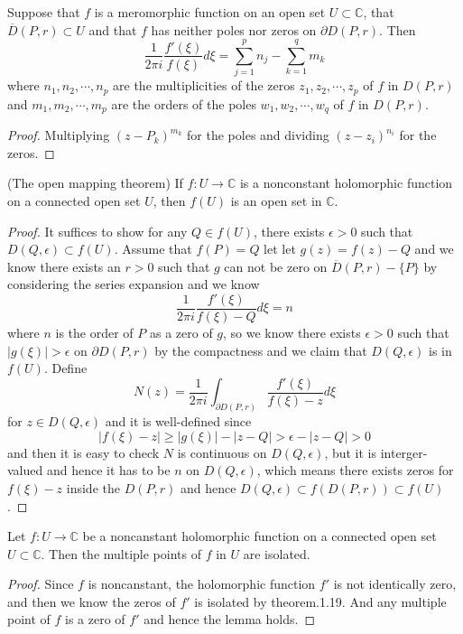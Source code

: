 \documentclass[lang=en, color=blue, ]{elegantbook}
\newcommand{\C}{\mathbb{C}}
\begin{document}
\begin{theorem}
    Suppose that $f$ is a meromorphic function on an open set $U\subset \C$, that $\overline{D}(P,r) \subset U$
    and that $f$ has neither poles nor zeros on $\partial D(P,r)$. Then
    \[\dfrac{1}{2\pi i}\dfrac{f'(\xi)}{f(\xi)} d\xi = \sum\limits_{j=1}^p n_j - \sum\limits_{k=1}^q m_k\]
    where $n_1,n_2,\cdots,n_p$ are the multiplicities of the zeros $z_1,z_2,\cdots,z_p$ of $f$ in $D(P,r)$ and $m_1,m_2,\cdots,m_p$ are the orders of the poles $w_1,w_2,\cdots,w_q$ of $f$ in $D(P,r)$.
\end{theorem}
\begin{proof}
    Multiplying $(z-P_k)^{m_k}$ for the poles and dividing $(z-z_i)^{n_i}$ for the zeros. 
\end{proof}

\begin{theorem}
    (The open mapping theorem) If $f:U\to\C$ is a nonconstant holomorphic function on a connected open set $U$, then $f(U)$ is an open set in $\C$.
\end{theorem}
\begin{proof}
    It suffices to show for any $Q\in f(U)$, there exists $\epsilon > 0$ such that $D(Q,\epsilon) \subset f(U)$. Assume that $f(P) = Q$ let let $g(z) = f(z)-Q$ and we know there exists an $r>0$ such that $g$ can not be zero on $\overline{D}(P,r)-\{P\}$ by considering the series expansion and we know
    \[
    \dfrac{1}{2\pi i} \dfrac{f'(\xi)}{f(\xi)-Q}d\xi = n
    \]
    where $n$ is the order of $P$ as a zero of $g$, so we know there exists $\epsilon > 0$ such that $|g(\xi)| > \epsilon$ on $\partial D(P,r)$ by the compactness and we claim that $D(Q,\epsilon)$ is in $f(U)$. Define
    \[N(z) = \dfrac{1}{2\pi i} \int_{\partial D(P,r)} \dfrac{f'(\xi)}{f(\xi) - z}d\xi\]
    for $z\in D(Q,\epsilon)$ and it is well-defined since
    \[|f(\xi)-z| \geq |g(\xi)| - |z-Q| > \epsilon - |z-Q| > 0\]
    and then it is easy to check $N$ is continuous on $D(Q,\epsilon)$, but it is interger-valued and hence it has to be $n$ on $D(Q,\epsilon)$, which means there exists zeros for $f(\xi) - z$ inside the $D(P,r)$ and hence $D(Q,\epsilon) \subset f(D(P,r)) \subset f(U)$.
\end{proof}

\begin{lemma}
    Let $f:U\to\C$ be a noncanstant holomorphic function on a connected open set $U\subset\C$. Then the multiple points of $f$ in $U$ are isolated.
\end{lemma}
\begin{proof}
    Since $f$ is noncanstant, the holomorphic function $f'$ is not identically zero, and then we know the zeros of $f'$ is isolated by theorem.1.19. And any multiple point of $f$ is a zero of $f'$ and hence the lemma holds.
\end{proof}
\end{document}
